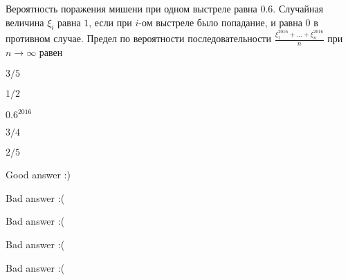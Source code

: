 
\begin{question}
Вероятность поражения мишени при одном выстреле равна \(0.6\). Случайная
величина \(\xi_i\) равна \(1\), если при \(i\)-ом выстреле было
попадание, и равна \(0\) в противном случае. Предел по вероятности
последовательности \(\frac{\xi_1^{2016} + \ldots + \xi_n^{2016}}{n}\)
при \(n \rightarrow \infty\) равен
\begin{answerlist}
  \item \(3/5\)
  \item \(1/2\)
  \item \(0.6^{2016}\)
  \item \(3/4\)
  \item \(2/5\)
\end{answerlist}
\end{question}

\begin{solution}
\begin{answerlist}
  \item Good answer :)
  \item Bad answer :(
  \item Bad answer :(
  \item Bad answer :(
  \item Bad answer :(
\end{answerlist}
\end{solution}

